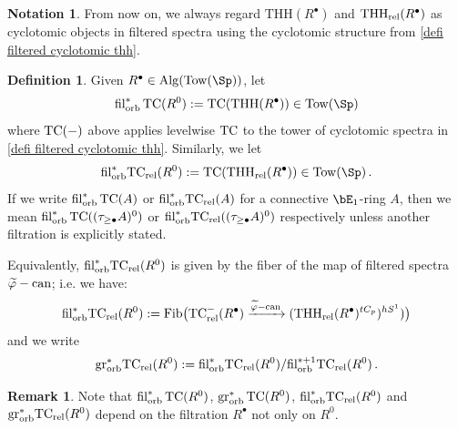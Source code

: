 \documentclass[english,10pt]{amsart}
\newcommand{\rel}{\textup{rel}}
\theoremstyle{definition}
\newtheorem{defn}{Definition}[section]
\newtheorem{nota}{Notation}[section]
\newtheorem{rema}{Remark}[section]
\numberwithin{equation}{section}
\DeclareMathOperator{\tc}{\ensuremath{\textup{TC}}}
\DeclareMathOperator{\thh}{\ensuremath{\textup{THH}}}
\newcommand{\rntc}{\mathrm{TC}_{\rel}^{-}}
\newcommand{\rtc}{\mathrm{TC}_{\rel}}
\newcommand{\rthh}{\mathrm{THH}_{\rel}}
\newcommand{\filorb}{\mathrm{fil}^{*}_{\textup{orb}}}
\newcommand{\grorbast}{\mathrm{gr}_{\textup{orb}}^*}
\newcommand{\filorbast}{\ensuremath{\textup{fil}}^*_{\textup{orb}}}
\newcommand{\filorbastplusone}{\ensuremath{\textup{fil}}^{*+1}_{\textup{orb}}}
\newcommand{\Tow}{\mathrm{Tow}}
\newcommand{\Alg}{\mathrm{Alg}}
\newcommand{\wtw}{\tau_{\geq \bullet}}
\begin{document}
\begin{nota}
From now on, we always regard $\mathrm{THH}(R^{\bullet})$ and $\mathrm{THH}_{\textup{rel}}(R^{\bullet})$ as cyclotomic objects in filtered spectra using the cyclotomic structure from \autoref{defi filtered cyclotomic thh}.
\end{nota}


\begin{defn}\label{defi orbitS filtration on tc}
Given $R^{\bullet}\in \Alg(\Tow(\Sp))$, let 
\[\filorb \tc(R^0) := \tc(\thh(R^{\bullet})) \in \mathrm{Tow}(\Sp)\]
where $\tc(-)$ above applies levelwise $\tc$ to the tower of cyclotomic spectra in \autoref{defi filtered cyclotomic thh}. Similarly, we let
\[\filorb \rtc(R^0) := \tc(\rthh(R^{\bullet})) \in \mathrm{Tow}(\Sp) \,.\]
If we write $\filorb \tc(A)$ or $\filorb \rtc(A)$ for a connective $\bE_1$-ring $A$, then we mean $\filorb \tc((\wtw A)^0)$ or $\filorb \rtc((\wtw A)^0)$ respectively unless another filtration is explicitly stated. 
\end{defn}

Equivalently,  $\filorb \rtc(R^0)$ is given by the fiber of the map of filtered spectra $\widetilde{\varphi} -\textup{can}$; i.e. we have:
\begin{equation}\label{eq fiber sequence defining orbit filtration}
\filorb \rtc(R^0) := \textup{Fib}\big(\rntc(R^{\bullet})  \xrightarrow{\widetilde{\varphi}-\textup{can}} (\rthh(R^{\bullet})^{tC_p})^{hS^1})\big)
\end{equation}
and we write 
\begin{equation}\label{eq orbit assoc graded}
\grorbast \rtc(R^0):=\filorbast \rtc(R^0)/\filorbastplusone \rtc(R^0)\,.
\end{equation}

\begin{rema}
Note that $\filorb \tc(R^0)$, $\grorbast \tc(R^0)$, $\filorb \rtc(R^0)$ and $\grorbast \rtc(R^0)$ depend on the filtration $R^\bullet$ not only on $R^0$.
\end{rema}
\end{document}
